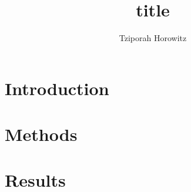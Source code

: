 \documentclass[letterpaper,man,natbib,donotrepeattitle]{apa6}
\title{title}  %
\author{Tziporah Horowitz}
\affiliation{Johns Hopkins University}
\begin{document}
\maketitle

\section{Introduction}\label{sec:introduction}

\pagebreak

\section{Methods}\label{sec:methods}


\section{Results}\label{sec:results}



\end{document}
